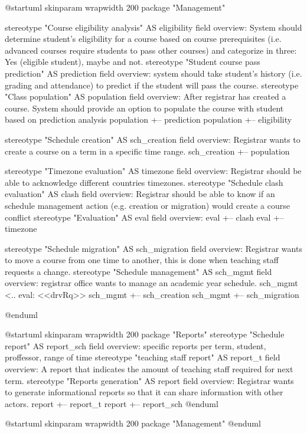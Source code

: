 \begin{plantuml}
@startuml
    skinparam wrapwidth 200
    package "Management" {
    stereotype "Course eligibility analysis" AS eligibility {
        {field} overview: System should determine student's eligibility for a course based on course prerequisites (i.e. advanced courses require students to pass other courses) and categorize in three: Yes (eligible student), maybe and not.
    }
    stereotype "Student course pass prediction" AS prediction {
        {field} overview: system should take student's history (i.e. grading and attendance) to predict if the student will pass the course.
    }
    stereotype "Class population" AS population {
        {field} overview: After registrar has created a course. System should provide an option to populate the course with student based on prediction analysis
    }
    population +-- prediction
    population +-- eligibility

    stereotype "Schedule creation" AS sch_creation {
        {field} overview: Registrar wants to create a course on a term in a specific time range.
    }
    sch_creation +-- population

    stereotype "Timezone evaluation" AS timezone {
        {field} overview: Registrar should be able to acknowledge different countries timezones.
    }
    stereotype "Schedule clash evaluation" AS clash {
        {field} overview: Registrar should be able to know if an schedule management action (e.g. creation or migration) would create a course conflict
    }
    stereotype "Evaluation" AS eval {
        {field} overview:
    }
    eval +-- clash
    eval +-- timezone

    stereotype "Schedule migration" AS sch_migration {
        {field} overview: Registrar wants to move a course from one time to another, this is done when teaching staff requests a change.
    }
    stereotype "Schedule management" AS sch_mgmt{
        {field} overview: registrar office wants to manage an academic year schedule.
    }
    sch_mgmt <.. eval: <<drvRq>>
    sch_mgmt +-- sch_creation
    sch_mgmt +-- sch_migration
    }
@enduml
\end{plantuml}

\begin{plantuml}
@startuml
    skinparam wrapwidth 200
    package "Reports" {
    stereotype "Schedule report" AS report_sch{
        {field} overview: specific reports per term, student, proffessor, range of time
    }
    stereotype "teaching staff report" AS report_t{
        {field} overview: A report that indicates the amount of teaching staff required for next term.
    }
    stereotype "Reports generation" AS report{
        {field} overview: Registrar wants to generate informational reports so that it can share information with other actors.
    }
    report +-- report_t
    report +-- report_sch
    }
@enduml
\end{plantuml}

\begin{plantuml}
@startuml
    skinparam wrapwidth 200
    package "Management" {
    }
@enduml
\end{plantuml}

